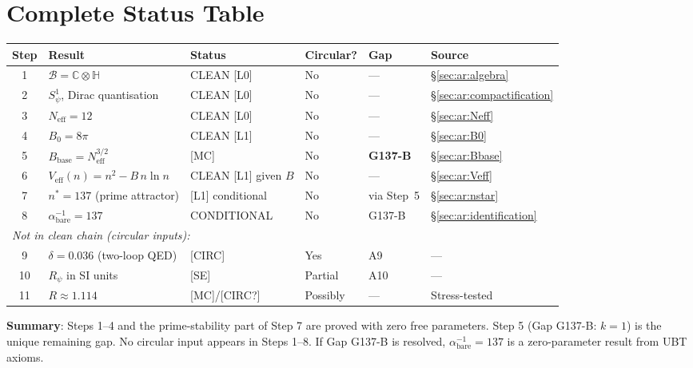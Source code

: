 \documentclass[12pt,a4paper]{article}
\theoremstyle{definition}
\theoremstyle{remark}
\begin{document}
\section{Complete Status Table}
\label{sec:ar:status}

\begin{center}
\renewcommand{\arraystretch}{1.35}
\begin{tabular}{clllll}
\toprule
Step & Result & Status & Circular? & Gap & Source \\
\midrule
1 & $\mathcal{B} = \mathbb{C}\otimes\mathbb{H}$ & CLEAN [L0] & No & — & \S\ref{sec:ar:algebra} \\
2 & $S^1_\psi$, Dirac quantisation & CLEAN [L0] & No & — & \S\ref{sec:ar:compactification} \\
3 & $N_{\mathrm{eff}} = 12$ & CLEAN [L0] & No & — & \S\ref{sec:ar:Neff} \\
4 & $B_0 = 8\pi$ & CLEAN [L1] & No & — & \S\ref{sec:ar:B0} \\
5 & $B_{\mathrm{base}} = N_{\mathrm{eff}}^{3/2}$ & [MC] & No & \textbf{G137-B} & \S\ref{sec:ar:Bbase} \\
6 & $V_{\mathrm{eff}}(n) = n^2 - B\,n\ln n$ & CLEAN [L1] given $B$ & No & — & \S\ref{sec:ar:Veff} \\
7 & $n^* = 137$ (prime attractor) & [L1] conditional & No & via Step~5 & \S\ref{sec:ar:nstar} \\
8 & $\alpha^{-1}_{\mathrm{bare}} = 137$ & CONDITIONAL & No & G137-B & \S\ref{sec:ar:identification} \\
\midrule
\multicolumn{6}{l}{\emph{Not in clean chain (circular inputs):}} \\
9 & $\delta = 0.036$ (two-loop QED) & [CIRC] & Yes & A9 & — \\
10 & $R_\psi$ in SI units & [SE] & Partial & A10 & — \\
11 & $R \approx 1.114$ & [MC]/[CIRC?] & Possibly & — & Stress-tested \\
\bottomrule
\end{tabular}
\end{center}

\begin{resultbox}
\textbf{Summary}: Steps 1--4 and the prime-stability part of Step 7 are proved
with zero free parameters.  Step 5 (Gap G137-B: $k=1$) is the unique remaining gap.
No circular input appears in Steps 1--8.  If Gap G137-B is resolved,
$\alpha^{-1}_{\mathrm{bare}} = 137$ is a zero-parameter result from UBT axioms.
\end{resultbox}
\end{document}
